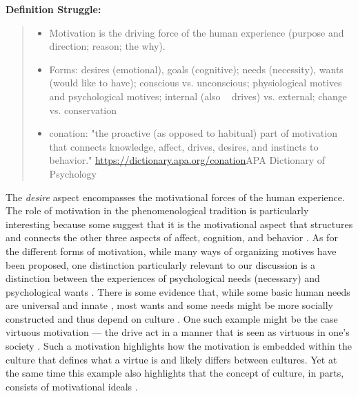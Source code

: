 \documentclass[nobib]{tufte-handout}
\begin{document}
\begin{framed}
    \textbf{Definition Struggle:}\\ 
    \begin{quote}
        \begin{itemize}
            \item Motivation is the driving force of the human experience (purpose and direction; reason; the why).
            \item Forms: desires (emotional), goals (cognitive); needs (necessity), wants (would like to have); conscious vs. unconscious; physiological motives and psychological motives; internal (also ~ drives) vs. external; change vs. conservation
            \item conation: "the proactive (as opposed to habitual) part of motivation that connects knowledge, affect, drives, desires, and instincts to behavior." \url{https://dictionary.apa.org/conation}{APA Dictionary of Psychology}
        \end{itemize}
    \end{quote}
\end{framed}

The \textit{desire} aspect  encompasses the motivational forces of the human experience. The role of motivation in the phenomenological tradition is particularly interesting because some suggest that it is the motivational aspect that structures and connects the other three aspects of affect, cognition, and behavior \citep[e.g.,][]{Hilgard1980}. As for the different forms of motivation, while many ways of organizing motives have been proposed, one distinction particularly relevant to our discussion is a distinction between the experiences of psychological needs (necessary) and psychological wants \citep[desired without necessity][]{Esposti2015}. There is some evidence that, while some basic human needs are universal and innate \citep[e.g.,][]{Ryan2000}, most wants and some needs might be more socially constructed and thus depend on culture \citep[e.g.,][]{McInerney2016, Morling2017}. One such example might be the case virtuous motivation --- the drive act in a manner that is seen as virtuous in one's society \citep{Stohr2017}. Such a motivation highlights how the motivation is embedded within the culture that defines what a virtue is and likely differs between cultures. Yet at the same time this example also highlights that the concept of culture, in parts, consists of motivational ideals \citep[or oughts; e.g., see][]{Markus1991}.
\end{document}

